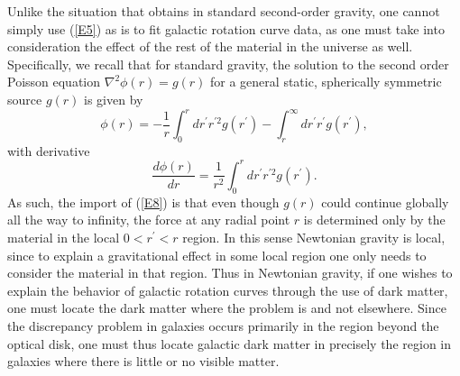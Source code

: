 \documentclass[preprint,aps]{revtex4}
\begin{document}
Unlike the situation that obtains in standard second-order gravity, one cannot simply use (\ref{E5}) as is to fit galactic rotation curve data, as one must take into consideration the effect of the rest of the material in the universe as well. Specifically, we recall that for standard gravity, the solution to the second order Poisson equation $\nabla^2\phi(r)=g(r)$ for a general static, spherically symmetric source $g(r)$ is given by 
%                                                                               
\begin{equation}
\phi(r)= -\frac{1}{r}\int_0^r
dr^{\prime}r^{\prime 2}g(r^{\prime})-\int_r^{\infty}
dr^{\prime}r^{\prime }g(r^{\prime}),
\label{E7}
\end{equation}                                 
%
with derivative 
%                                                                               
\begin{equation}
\frac{d\phi(r)}{dr}= \frac{1}{r^2}\int_0^r
dr^{\prime}r^{\prime 2}g(r^{\prime}).
\label{E8}
\end{equation}                                 
%
As such, the import of (\ref{E8}) is that even though $g(r)$ could continue globally all the way to infinity, the force at any radial point $r$ is determined only by the material in the local $0< r^{\prime}< r$ region. In this sense Newtonian gravity is local, since to explain a gravitational effect in some local region one only needs to consider the material in that region. Thus in Newtonian gravity, if one wishes to explain the behavior of galactic rotation curves through the use of dark matter, one must locate the dark matter where the problem is and not elsewhere. Since the discrepancy problem in galaxies occurs primarily in the region beyond the optical disk, one must thus locate galactic dark matter in precisely the region in galaxies where there is little or no visible matter.
\end{document}
